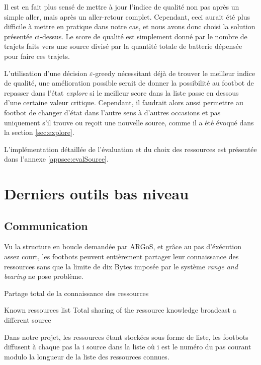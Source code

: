 Il est en fait plus sensé de mettre à jour l'indice de qualité non pas après un simple aller, mais après un aller-retour complet. Cependant, ceci aurait été plus difficile à mettre en pratique dans notre cas, et nous avons donc choisi la solution présentée ci-dessus. Le score de qualité est simplement donné par le nombre de trajets faits vers une source divisé par la quantité totale de batterie dépensée pour faire ces trajets.

L'utilisation d'une décision $\varepsilon$-greedy nécessitant déjà de trouver le meilleur indice de qualité, une amélioration possible serait de donner la possibilité au footbot de repasser dans l'état \emph{explore} si le meilleur score dans la liste passe en dessous d'une certaine valeur critique. Cependant, il faudrait alors aussi permettre au footbot de changer d'état dans l'autre sens à d'autres occasions et pas uniquement s'il trouve ou reçoit une nouvelle source, comme il a été évoqué dans la section \ref{sec:explore}.

L'implémentation détaillée de l'évaluation et du choix des ressources est présentée dans l'annexe \ref{appsec:evalSource}.

\section{Derniers outils bas niveau}

\subsection{Communication\label{sec:commu}}

Vu la structure en boucle demandée par ARGoS, et grâce au pas d'éxécution assez court, les footbots peuvent entièrement partager leur connaissance des ressources sans que la limite de dix Bytes imposée par le système \emph{range and bearing} ne pose problème.

\begin{algorithm}
  \caption{Partage total de la connaissance des ressources}
  \begin{algorithmic}
  \REQUIRE Known ressources list
  \ENSURE Total sharing of the ressource knowledge
  \LOOP
  \STATE broadcast a different source
  \ENDLOOP
  \end{algorithmic}
\end{algorithm}

Dans notre projet, les ressources étant stockées sous forme de liste, les footbots diffusent à chaque pas la i\ieme{} source dans la liste où i est le numéro du pas courant modulo la longueur de la liste des ressources connues.

